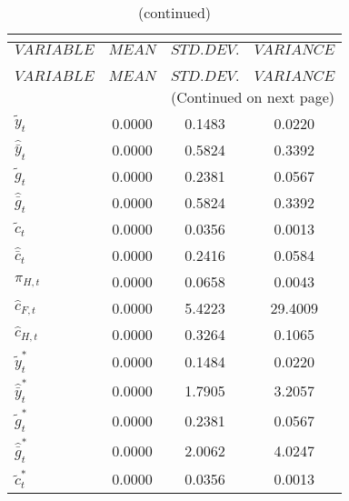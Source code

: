  
\begin{center}
\begin{longtable}{lccc} 
\caption{THEORETICAL MOMENTS}\\
 \label{Table:th_moments}\\
\toprule 
$VARIABLE             $	 & 	 $         MEAN$	 & 	 $    STD. DEV.$	 & 	 $     VARIANCE$\\
\midrule \endfirsthead 
\caption{(continued)}\\
 \toprule \\ 
$VARIABLE             $	 & 	 $         MEAN$	 & 	 $    STD. DEV.$	 & 	 $     VARIANCE$\\
\midrule \endhead 
\midrule \multicolumn{4}{r}{(Continued on next page)} \\ \bottomrule \endfoot 
\bottomrule \endlastfoot 
${\tilde y_t}         $	 & 	       0.0000	 & 	       0.1483	 & 	       0.0220 \\ 
${\hat {\bar y}_t}    $	 & 	       0.0000	 & 	       0.5824	 & 	       0.3392 \\ 
${\tilde g_t}         $	 & 	       0.0000	 & 	       0.2381	 & 	       0.0567 \\ 
${\hat {\bar g}_t}    $	 & 	       0.0000	 & 	       0.5824	 & 	       0.3392 \\ 
${\tilde c_t}         $	 & 	       0.0000	 & 	       0.0356	 & 	       0.0013 \\ 
${\hat {\bar c}_t}    $	 & 	       0.0000	 & 	       0.2416	 & 	       0.0584 \\ 
${\pi_{H,t}}          $	 & 	       0.0000	 & 	       0.0658	 & 	       0.0043 \\ 
${\hat c_{F,t}}       $	 & 	       0.0000	 & 	       5.4223	 & 	      29.4009 \\ 
${\hat c_{H,t}}       $	 & 	       0.0000	 & 	       0.3264	 & 	       0.1065 \\ 
${\tilde y_t^*}       $	 & 	       0.0000	 & 	       0.1484	 & 	       0.0220 \\ 
${\hat {\bar y}_t^*}  $	 & 	       0.0000	 & 	       1.7905	 & 	       3.2057 \\ 
${\tilde g_t^*}       $	 & 	       0.0000	 & 	       0.2381	 & 	       0.0567 \\ 
${\hat {\bar g}_t^*}  $	 & 	       0.0000	 & 	       2.0062	 & 	       4.0247 \\ 
${\tilde c_t^*}       $	 & 	       0.0000	 & 	       0.0356	 & 	       0.0013 \\ 

\end{longtable}
\end{center}
